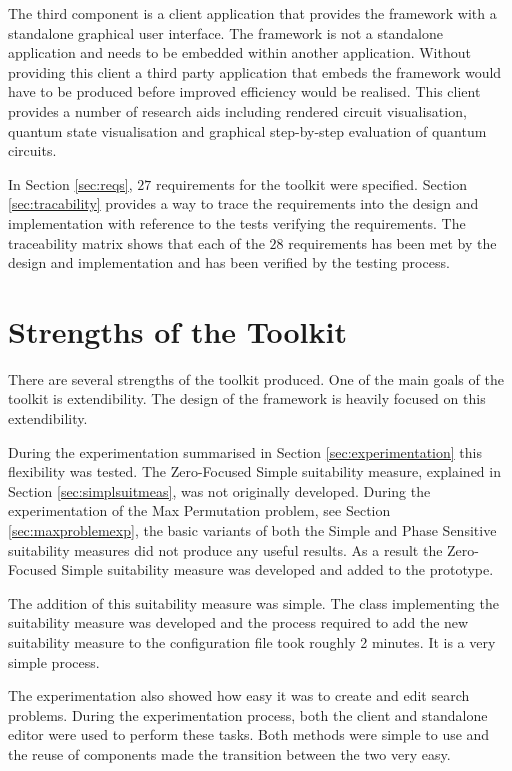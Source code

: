 The third component is a client application that provides the framework with a standalone graphical user interface.
The framework is not a standalone application and needs to be embedded within another application.
Without providing this client a third party application that embeds the framework would have to be produced before improved efficiency would be realised.
This client provides a number of research aids including rendered circuit visualisation, quantum state visualisation and graphical step-by-step evaluation of quantum circuits.

In Section \ref{sec:reqs}, $27$ requirements for the toolkit were specified.
Section \ref{sec:tracability} provides a way to trace the requirements into the design and implementation with reference to the tests verifying the requirements.
The traceability matrix shows that each of the $28$ requirements has been met by the design and implementation and has been verified by the testing process.

\section{Strengths of the Toolkit}

There are several strengths of the toolkit produced.
One of the main goals of the toolkit is extendibility.
The design of the framework is heavily focused on this extendibility.

During the experimentation summarised in Section \ref{sec:experimentation} this flexibility was tested.
The Zero-Focused Simple suitability measure, explained in Section \ref{sec:simplsuitmeas}, was not originally developed.
During the experimentation of the Max Permutation problem, see Section \ref{sec:maxproblemexp}, the basic variants of both the Simple and Phase Sensitive suitability measures did not produce any useful results.
As a result the Zero-Focused Simple suitability measure was developed and added to the prototype.

The addition of this suitability measure was simple.
The class implementing the suitability measure was developed and the process required to add the new suitability measure to the configuration file took roughly 2 minutes.
It is a very simple process.

The experimentation also showed how easy it was to create and edit search problems.
During the experimentation process, both the client and standalone editor were used to perform these tasks.
Both methods were simple to use and the reuse of components made the transition between the two very easy.

